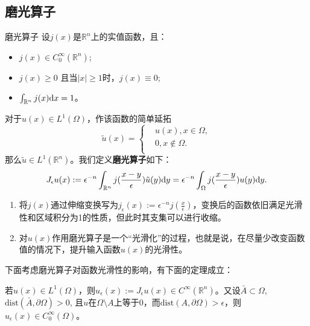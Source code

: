 \subsection{磨光算子}
\begin{definition}{磨光算子}
    \label{def:smoother}
    设$j(x)$是$\mathbb{R}^{n}$上的实值函数，且：
    \begin{itemize}
        \item $j(x)\in C_{0}^{\infty}(\mathbb{R}^{n})$;
        \item $j(x)\ge 0 $ 且当$|x|\ge 1$时，$j(x)\equiv 0$;
        \item $\int_{\mathbb{R}^{n}}j(x)\mathrm{d} x=1$。
    \end{itemize}
    对于$u(x)\in L^{1}(\Omega)$，作该函数的简单延拓
    \begin{equation}
        \tilde{u}(x)=\left\{
            \begin{aligned}
                &u(x),x\in\Omega,\\
                &0,x\notin\Omega.\\
            \end{aligned}
        \right.
    \end{equation}
    那么$\tilde{u}\in L^{1}(\mathbb{R}^{n})$。我们定义\textbf{磨光算子}如下：
    \begin{equation}
        \label{eq:smoother}
        J_{\epsilon}u(x):=\epsilon^{-n}\int_{\mathbb{R}^{n}}j(\frac{x-y}{\epsilon})\tilde{u}(y)\mathrm{d} y=\epsilon^{-n}\int_{\Omega}j(\frac{x-y}{\epsilon})u(y)\mathrm{d} y.
    \end{equation}
\end{definition}
\begin{remark}
    \begin{enumerate}
        \item 将$j(x)$通过伸缩变换写为$j_{\epsilon}(x):=\epsilon^{-n}j(\frac{x}{\epsilon})$，变换后的函数依旧满足光滑性和区域积分为1的性质，但此时其支集可以进行收缩。
        \item 对$u(x)$作用磨光算子是一个“光滑化”的过程，也就是说，在尽量少改变函数值的情况下，提升输入函数$u(x)$的光滑性。
    \end{enumerate}
\end{remark}
下面考虑磨光算子对函数光滑性的影响，有下面的定理成立：
\begin{theorem}
    若$u(x)\in L^{1}(\Omega)$，则$u_{\epsilon}(x):=J_{\epsilon}u(x)\in C^{\infty}(\mathbb{R}^{n})$。又设$\bar{A}\subset \Omega$, $\text{dist}(\bar{A},\partial\Omega)>0$, 且$u$在$\Omega\setminus A$上等于0，而$\text{dist}(A,\partial\Omega)>\epsilon$，则$u_{\epsilon}(x)\in C_{0}^{\infty}(\Omega)$。
\end{theorem}
